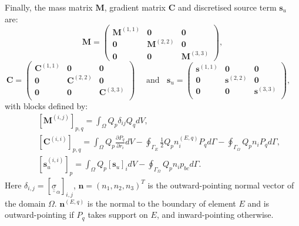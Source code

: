 \documentclass[preprint,authoryear,12pt]{elsarticle}
\begin{document}
Finally, the mass matrix ${\mathbf M}$, gradient matrix
${\mathbf C}$ and discretised source term ${\mathbf s}_{u}$ are:
\[\mathbf{M}=\left(
\begin{array}{ccc}
  \bm{M}^{(1,1)} &\bm{0} &\bm{0} \\
  \bm{0}   &\bm{M}^{(2,2)} &\bm{0} \\
  \bm{0} &\bm{0}  &\bm{M}^{(3,3)}   
\end{array}\right),\]
\[
\bm{C}=\left(
\begin{array}{ccc}
  \bm{C}^{(1,1)}&\bm{0}&\bm{0}\\
  \bm{0}&\bm{C}^{(2,2)}&\bm{0}\\
  \bm{0}&\bm{0}&\bm{C}^{(3,3)}\\
\end{array}\right)\quad \text{ and } \;\;
\bm{s}_u=\left(
\begin{array}{ccc}
  \bm{s}^{(1,1)}&\bm{0}&\bm{0}\\
  \bm{0}&\bm{s}^{(2,2)}&\bm{0}\\
  \bm{0}&\bm{0}&\bm{s}^{(3,3)}\\
\end{array}\right),\quad
\]
with blocks defined by:
\begin{eqnarray}
  && \left[{\mathbf M}^{(i,j)}\right]_{p,q} = \int_{\Omega}  Q_{p} \delta_{ij}
{Q}_{q}  dV, \nonumber \\
  && {\left[\bm{C}^{(i,i)}\right]_{p,q} = \int_{\Omega} Q_{p} \frac{\partial P_{q}}{\partial r_i} dV - \oint_{\Gamma_{E}} \displaystyle\frac{1}{2} Q_{p} n_i^{(E,q)} P_{q} d\Gamma -  \oint_{\Gamma_{\Omega}} \displaystyle Q_{p} n_i P_{q} d\Gamma}, \nonumber \\
  && {\left[\bm{s}_{u}^{(i,i)}\right]_{p} = \int_{\Omega} Q_p} \left[{\mathbf s}_{u}\right]_i dV - \oint_{\Gamma_{\Omega}}\displaystyle Q_{p} n_i p_{bc} d\Gamma. \nonumber
\end{eqnarray}
Here $\delta_{i,j} = \left[\underline{\underline{\sigma}}_{\alpha}\right]_{i,j}$,  $\bm{n}=\left(n_{1},n_{2},n_{3}\right)^{T}$ is the outward-pointing normal vector of the domain $\Omega$. $\bm{n}^{(E,q)}$ is the normal to the boundary of element $E$ and is outward-pointing if $P_{q}$ takes support on $E$, and inward-pointing otherwise. 

\medskip
\end{document}

